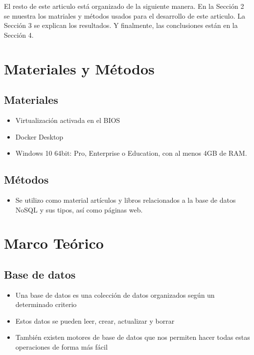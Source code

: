 \documentclass[%
 reprint,
 amsmath,amssymb,
 aps,
]{revtex4-1}
\begin{document}
\par El resto de este articulo está organizado de la siguiente manera. En la Sección 2 se muestra los matriales y métodos usados para el desarrollo de este articulo. La Sección 3 se explican los resultados. Y finalmente, las conclusiones están en la Sección 4.



\section{Materiales y Métodos}\label{sec:2}
\subsection{Materiales}
	\begin{itemize}
		\item Virtualización activada en el BIOS
		\item Docker Desktop
		\item Windows 10 64bit: Pro, Enterprise o Education, con al menos 4GB de RAM.
	\end{itemize}
\subsection{Métodos}
	\begin{itemize}
		\item Se utilizo como material artículos y libros relacionados a la base de datos NoSQL y sus tipos, así como páginas web.
	\end{itemize}
\section{Marco Teórico}\label{sec:3}
\subsection{Base de datos}
	          \begin{itemize}
		\item Una base de datos es una colección de datos organizados según un determinado criterio
		\item Estos datos se pueden leer, crear, actualizar y borrar
		\item También existen motores de base de datos que nos permiten hacer todas estas operaciones de forma más fácil
	          \end{itemize}
\end{document}
